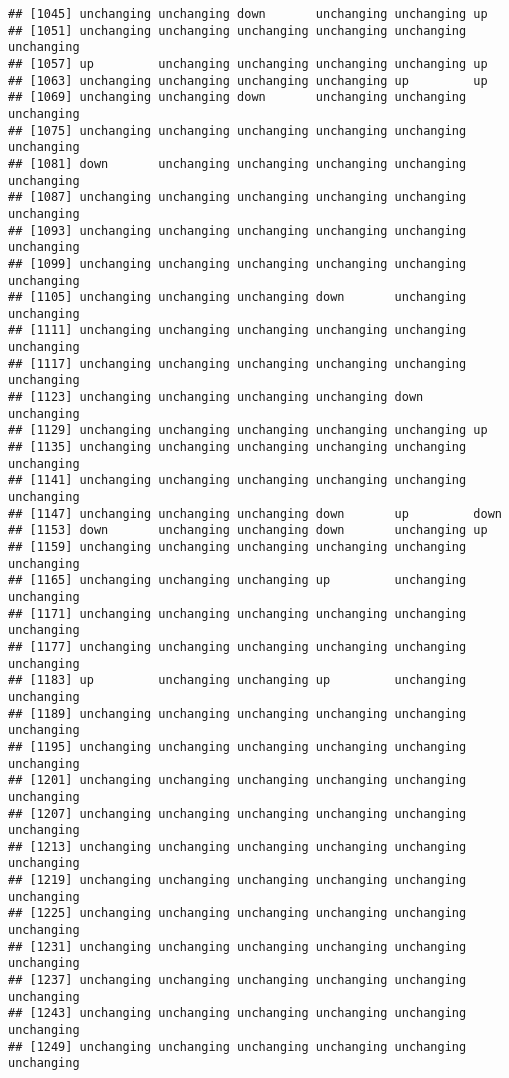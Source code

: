 \documentclass[]{article}
\begin{document}
\begin{verbatim}
## [1045] unchanging unchanging down       unchanging unchanging up        
## [1051] unchanging unchanging unchanging unchanging unchanging unchanging
## [1057] up         unchanging unchanging unchanging unchanging up        
## [1063] unchanging unchanging unchanging unchanging up         up        
## [1069] unchanging unchanging down       unchanging unchanging unchanging
## [1075] unchanging unchanging unchanging unchanging unchanging unchanging
## [1081] down       unchanging unchanging unchanging unchanging unchanging
## [1087] unchanging unchanging unchanging unchanging unchanging unchanging
## [1093] unchanging unchanging unchanging unchanging unchanging unchanging
## [1099] unchanging unchanging unchanging unchanging unchanging unchanging
## [1105] unchanging unchanging unchanging down       unchanging unchanging
## [1111] unchanging unchanging unchanging unchanging unchanging unchanging
## [1117] unchanging unchanging unchanging unchanging unchanging unchanging
## [1123] unchanging unchanging unchanging unchanging down       unchanging
## [1129] unchanging unchanging unchanging unchanging unchanging up        
## [1135] unchanging unchanging unchanging unchanging unchanging unchanging
## [1141] unchanging unchanging unchanging unchanging unchanging unchanging
## [1147] unchanging unchanging unchanging down       up         down      
## [1153] down       unchanging unchanging down       unchanging up        
## [1159] unchanging unchanging unchanging unchanging unchanging unchanging
## [1165] unchanging unchanging unchanging up         unchanging unchanging
## [1171] unchanging unchanging unchanging unchanging unchanging unchanging
## [1177] unchanging unchanging unchanging unchanging unchanging unchanging
## [1183] up         unchanging unchanging up         unchanging unchanging
## [1189] unchanging unchanging unchanging unchanging unchanging unchanging
## [1195] unchanging unchanging unchanging unchanging unchanging unchanging
## [1201] unchanging unchanging unchanging unchanging unchanging unchanging
## [1207] unchanging unchanging unchanging unchanging unchanging unchanging
## [1213] unchanging unchanging unchanging unchanging unchanging unchanging
## [1219] unchanging unchanging unchanging unchanging unchanging unchanging
## [1225] unchanging unchanging unchanging unchanging unchanging unchanging
## [1231] unchanging unchanging unchanging unchanging unchanging unchanging
## [1237] unchanging unchanging unchanging unchanging unchanging unchanging
## [1243] unchanging unchanging unchanging unchanging unchanging unchanging
## [1249] unchanging unchanging unchanging unchanging unchanging unchanging

\end{verbatim}
\end{document}
